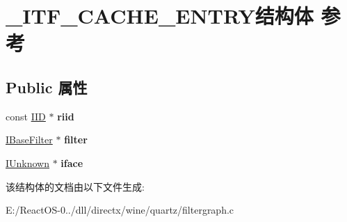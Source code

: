 \hypertarget{struct___i_t_f___c_a_c_h_e___e_n_t_r_y}{}\section{\+\_\+\+I\+T\+F\+\_\+\+C\+A\+C\+H\+E\+\_\+\+E\+N\+T\+R\+Y结构体 参考}
\label{struct___i_t_f___c_a_c_h_e___e_n_t_r_y}
\subsection*{Public 属性}
\begin{DoxyCompactItemize}
\item 
\mbox{\label{struct___i_t_f___c_a_c_h_e___e_n_t_r_y_a127f80b4b3c7ec37432057e84eb40946}} 
const \hyperlink{struct___i_i_d}{I\+ID} $\ast$ {\bfseries riid}
\item 
\mbox{\label{struct___i_t_f___c_a_c_h_e___e_n_t_r_y_adc5b74aea8b004d51e80bd0e4898f5c3}} 
\hyperlink{interface_i_base_filter}{I\+Base\+Filter} $\ast$ {\bfseries filter}
\item 
\mbox{\label{struct___i_t_f___c_a_c_h_e___e_n_t_r_y_a017b356a48541748b9393d89645bc3c5}} 
\hyperlink{interface_i_unknown}{I\+Unknown} $\ast$ {\bfseries iface}
\end{DoxyCompactItemize}


该结构体的文档由以下文件生成\+:\begin{DoxyCompactItemize}
\item 
E\+:/\+React\+O\+S-\/0../dll/directx/wine/quartz/filtergraph.\+c\end{DoxyCompactItemize}
